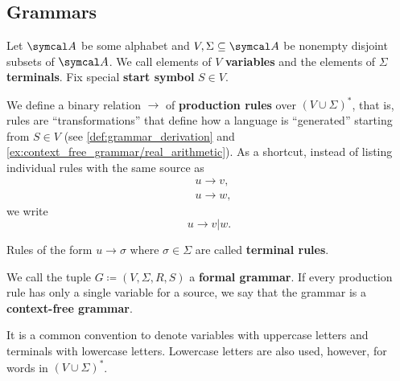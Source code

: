\subsection{Grammars}\label{subsec:grammars}

\begin{definition}\label{def:grammar}\cite[definition 2.2]{Sipser2013}
  Let \( \Cal{A} \) be some alphabet and \( V, \Sigma \subseteq \Cal{A} \) be nonempty disjoint subsets of \( \Cal{A} \). We call elements of \( V \) \textbf{variables} and the elements of \( \Sigma \) \textbf{terminals}. Fix special \textbf{start symbol} \( S \in V \).

  We define a binary relation \( \to \) of \textbf{production rules} over \( (V \cup \Sigma)^* \), that is, rules are \enquote{transformations} that define how a language is \enquote{generated} starting from \( S \in V \) (see \cref{def:grammar_derivation} and \cref{ex:context_free_grammar/real_arithmetic}). As a shortcut, instead of listing individual rules with the same source as
  \begin{align*}
    &u \to v, \\
    &u \to w,
  \end{align*}
  we write
  \begin{equation*}
    u \to v | w.
  \end{equation*}

  Rules of the form \( u \to \sigma \) where \( \sigma \in \Sigma \) are called \textbf{terminal rules}.

  We call the tuple \( G \coloneqq (V, \Sigma, R, S) \) a \textbf{formal grammar}. If every production rule has only a single variable for a source, we say that the grammar is a \textbf{context-free grammar}.
\end{definition}

\begin{note}\label{note:grammar_symbol_case}
  It is a common convention to denote variables with uppercase letters and terminals with lowercase letters. Lowercase letters are also used, however, for words in \( (V \cup \Sigma)^* \).
\end{note}

